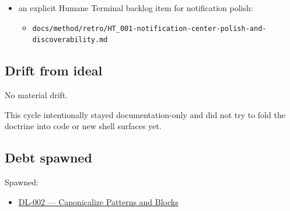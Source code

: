 \begin{itemize}
\begin{itemize}
  \item
    \texttt{d\allowbreak{}o\allowbreak{}c\allowbreak{}s\allowbreak{}/\allowbreak{}s\allowbreak{}t\allowbreak{}r\allowbreak{}a\allowbreak{}t\allowbreak{}e\allowbreak{}g\allowbreak{}y\allowbreak{}/\allowbreak{}c\allowbreak{}o\allowbreak{}n\allowbreak{}t\allowbreak{}e\allowbreak{}n\allowbreak{}t\allowbreak{}-\allowbreak{}g\allowbreak{}u\allowbreak{}i\allowbreak{}d\allowbreak{}e\allowbreak{}.\allowbreak{}m\allowbreak{}d}
  \end{itemize}
\item
  an explicit Humane Terminal backlog item for notification polish:

  \begin{itemize}
  \tightlist
  \item
    \texttt{d\allowbreak{}o\allowbreak{}c\allowbreak{}s\allowbreak{}/\allowbreak{}m\allowbreak{}e\allowbreak{}t\allowbreak{}h\allowbreak{}o\allowbreak{}d\allowbreak{}/\allowbreak{}r\allowbreak{}e\allowbreak{}t\allowbreak{}r\allowbreak{}o\allowbreak{}/\allowbreak{}H\allowbreak{}T\allowbreak{}\_\allowbreak{}0\allowbreak{}0\allowbreak{}1\allowbreak{}-\allowbreak{}n\allowbreak{}o\allowbreak{}t\allowbreak{}i\allowbreak{}f\allowbreak{}i\allowbreak{}c\allowbreak{}a\allowbreak{}t\allowbreak{}i\allowbreak{}o\allowbreak{}n\allowbreak{}-\allowbreak{}c\allowbreak{}e\allowbreak{}n\allowbreak{}t\allowbreak{}e\allowbreak{}r\allowbreak{}-\allowbreak{}p\allowbreak{}o\allowbreak{}l\allowbreak{}i\allowbreak{}s\allowbreak{}h\allowbreak{}-\allowbreak{}a\allowbreak{}n\allowbreak{}d\allowbreak{}-\allowbreak{}d\allowbreak{}i\allowbreak{}s\allowbreak{}c\allowbreak{}o\allowbreak{}v\allowbreak{}e\allowbreak{}r\allowbreak{}a\allowbreak{}b\allowbreak{}i\allowbreak{}l\allowbreak{}i\allowbreak{}t\allowbreak{}y\allowbreak{}.\allowbreak{}m\allowbreak{}d}
  \end{itemize}
\end{itemize}

\subsection{Drift from ideal}\label{record-168-drift-from-ideal}

No material drift.

This cycle intentionally stayed documentation-only and did not try to fold the doctrine into code or new shell surfaces yet.

\subsection{Debt spawned}\label{record-168-debt-spawned}

Spawned:

\begin{itemize}
\tightlist
\item
  \href{https://github.com/flyingrobots/bijou/blob/cbd70612140e7a450d764b3c7be1c6af878b99bc/docs/method/graveyard/legacy-backlog/DL-002-canonicalize-patterns-and-blocks.md}{DL-002 --- Canonicalize Patterns and Blocks}
\end{itemize}


